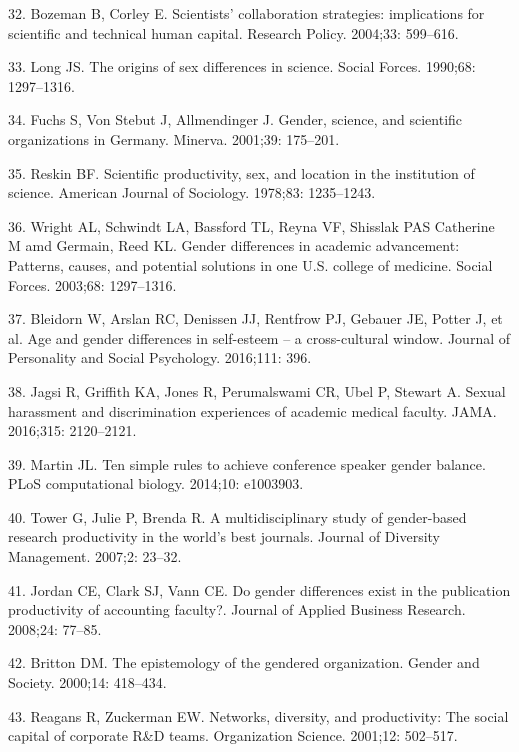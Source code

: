 \documentclass[12pt,]{article}
\begin{document}
\hypertarget{ref-Bozeman_2004}{}
32. Bozeman B, Corley E. Scientists' collaboration strategies:
implications for scientific and technical human capital. Research
Policy. 2004;33: 599--616.

\hypertarget{ref-Long_1990}{}
33. Long JS. The origins of sex differences in science. Social Forces.
1990;68: 1297--1316.

\hypertarget{ref-Fuchs_2001}{}
34. Fuchs S, Von Stebut J, Allmendinger J. Gender, science, and
scientific organizations in Germany. Minerva. 2001;39: 175--201.

\hypertarget{ref-Reskin_1978}{}
35. Reskin BF. Scientific productivity, sex, and location in the
institution of science. American Journal of Sociology. 1978;83:
1235--1243.

\hypertarget{ref-Wright_2003}{}
36. Wright AL, Schwindt LA, Bassford TL, Reyna VF, Shisslak PAS
Catherine M amd Germain, Reed KL. Gender differences in academic
advancement: Patterns, causes, and potential solutions in one U.S.
college of medicine. Social Forces. 2003;68: 1297--1316.

\hypertarget{ref-bleidorn2016age}{}
37. Bleidorn W, Arslan RC, Denissen JJ, Rentfrow PJ, Gebauer JE, Potter
J, et al. Age and gender differences in self-esteem -- a cross-cultural
window. Journal of Personality and Social Psychology. 2016;111: 396.

\hypertarget{ref-jagsi_2016}{}
38. Jagsi R, Griffith KA, Jones R, Perumalswami CR, Ubel P, Stewart A.
Sexual harassment and discrimination experiences of academic medical
faculty. JAMA. 2016;315: 2120--2121.

\hypertarget{ref-Martin_2014}{}
39. Martin JL. Ten simple rules to achieve conference speaker gender
balance. PLoS computational biology. 2014;10: e1003903.

\hypertarget{ref-Tower_2007}{}
40. Tower G, Julie P, Brenda R. A multidisciplinary study of
gender-based research productivity in the world's best journals. Journal
of Diversity Management. 2007;2: 23--32.

\hypertarget{ref-Jordan_2008}{}
41. Jordan CE, Clark SJ, Vann CE. Do gender differences exist in the
publication productivity of accounting faculty?. Journal of Applied
Business Research. 2008;24: 77--85.

\hypertarget{ref-Britton_2000}{}
42. Britton DM. The epistemology of the gendered organization. Gender
and Society. 2000;14: 418--434.

\hypertarget{ref-Reagans_2001}{}
43. Reagans R, Zuckerman EW. Networks, diversity, and productivity: The
social capital of corporate R\&D teams. Organization Science. 2001;12:
502--517.
\end{document}

